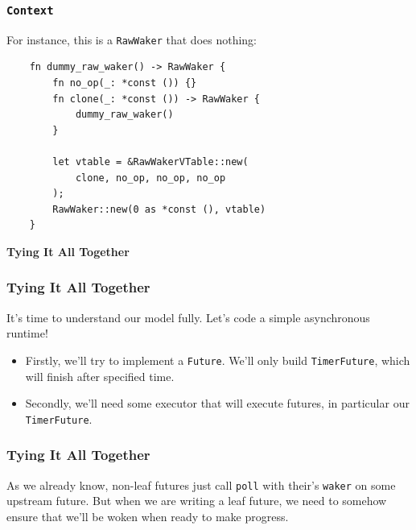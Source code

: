 \documentclass[aspectratio=1610,t]{beamer}
\begin{document}

\begin{frame}[fragile]
\frametitle{\texttt{Context}}
For instance, this is a \texttt{RawWaker} that does nothing:

\begin{verbatim}
    fn dummy_raw_waker() -> RawWaker {
        fn no_op(_: *const ()) {}
        fn clone(_: *const ()) -> RawWaker {
            dummy_raw_waker()
        }

        let vtable = &RawWakerVTable::new(
            clone, no_op, no_op, no_op
        );
        RawWaker::new(0 as *const (), vtable)
    }
\end{verbatim}
\end{frame}


\begin{frame}[c]
\centering\Huge\textbf{Tying It All Together}
\end{frame}


\begin{frame}[fragile]
\frametitle{Tying It All Together}
It's time to understand our model fully. Let's code a simple asynchronous runtime!

\begin{itemize}
    \item Firstly, we'll try to implement a \texttt{Future}. We'll only build \texttt{TimerFuture}, which will finish after specified time.
    \item Secondly, we'll need some executor that will execute futures, in particular our \texttt{TimerFuture}.
\end{itemize}
\end{frame}


\begin{frame}[fragile]
\frametitle{Tying It All Together}
As we already know, non-leaf futures just call \texttt{poll} with their's \texttt{waker} on some upstream future. But when we are writing a leaf future, we need to somehow ensure that we'll be woken when ready to make progress.


\end{frame}
\end{document}
